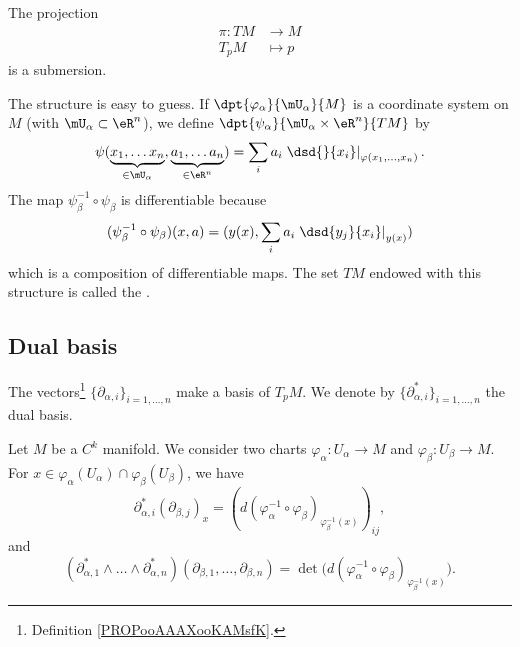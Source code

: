 \begin{proposition}			\label{PROPooMDDPooXeQwrH}
	The projection
	\begin{equation}
		\begin{aligned}
			\pi \colon TM & \to M     \\
			T_pM          & \mapsto p
		\end{aligned}
	\end{equation}
	is a submersion.
\end{proposition}

The structure is easy to guess. If $\dpt{\varphi_{\alpha}}{\mU_{\alpha}}{M}$ is a coordinate system on $M$ (with $\mU_{\alpha}\subset\eR^n$), we define $\dpt{\psi_{\alpha}}{\mU_{\alpha}\times \eR^n}{TM}$ by
\[
	\psi( \underbrace{x_1,\ldots x_n}_{\in\mU_{\alpha}},\underbrace{a_1,\ldots a_n}_{\in\eR^n}  )
	=\sum_i a_i\left.\dsd{}{x_i}\right|_{\varphi(x_1,\ldots,x_n)}.
\]
The map $\psi_{\beta}^{-1}\circ\psi_{\beta}$ is differentiable because
\[
	(\psi_{\beta}^{-1}\circ\psi_{\beta})(x,a)=( y(x),\sum_i a_i\left.\dsd{y_j}{x_i}\right|_{y(x)}  )
\]
which is a composition of differentiable maps. The set $TM$ endowed with this structure is called the .


\subsection{Dual basis}


\begin{definition}		\label{DEFooZNHIooKIpND}
	The vectors\footnote{Definition \ref{PROPooAAAXooKAMsfK}.} \( \{ \partial_{\alpha,i} \}_{i=1,\ldots,n}\) make a basis of \( T_pM\). We denote by \( \{ \partial^*_{\alpha, i} \}_{i=1,\ldots,n}\) the dual basis.
\end{definition}

\begin{lemma}		\label{LEMooSZTOooBIzMCc}
	Let \( M\) be a \( C^k\) manifold. We consider two charts \(\varphi_{\alpha} \colon U_{\alpha}\to M  \) and \(\varphi_{\beta} \colon U_{\beta}\to M  \). For \( x\in \varphi_{\alpha}(U_{\alpha})\cap \varphi_{\beta}(U_{\beta})\), we have
	\begin{equation}		\label{EQooQNRRooKkCkLE}
		\partial^*_{\alpha,i}(\partial_{\beta,j})_x=(d(\varphi_{\alpha}^{-1}\circ \varphi_{\beta})_{\varphi_{\beta}^{-1}(x)})_{ij},
	\end{equation}
	and
	\begin{equation}		\label{EQooAGFKooWwWdAf}
		(\partial_{\alpha, 1}^*\wedge\ldots \wedge\partial_{\alpha,n}^*)(\partial_{\beta,1},\ldots,\partial_{\beta,n})=\det\big( d(\varphi_{\alpha}^{-1}\circ\varphi_{\beta})_{\varphi_{\beta}^{-1}(x)} \big).
	\end{equation}
\end{lemma}

